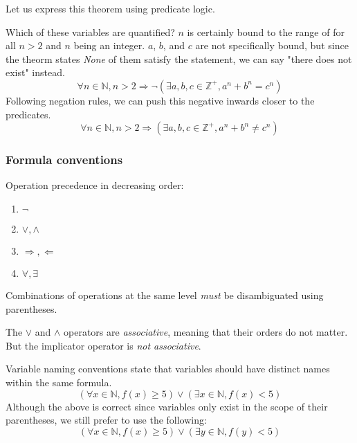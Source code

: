 \documentclass{article}
\begin{document}
Let us express this theorem using predicate logic. 

Which of these variables are quantified? $n$ is certainly bound to the range of 
for all $n > 2$ and $n$ being an integer. $a$, $b$, and $c$ are not specifically 
bound, but since the theorm states \textit{None} of them satisfy the statement, 
we can say "there does not exist" instead.
$$\forall n \in \mathbb{N}, n > 2 \Rightarrow \neg (\exists a, b, c \in 
\mathbb{Z}^+, a^n + b^n = c^n )$$
Following negation rules, we can push this negative inwards closer to the predicates.
$$\forall n \in \mathbb{N}, n > 2 \Rightarrow (\exists a, b, c \in 
\mathbb{Z}^+, a^n + b^n \ne c^n)$$

\subsubsection*{Formula conventions}
Operation precedence in decreasing order:
\begin{center}
\begin{enumerate}
    \item $\neg$
    \item $\lor, \land$
    \item $\Rightarrow, \Leftarrow$
    \item $\forall, \exists$
\end{enumerate}
\end{center}
Combinations of operations at the same level \textit{must} be disambiguated 
using parentheses. 

The $\lor$ and $\land$ operators are \textit{associative}, meaning that their 
orders do not matter. But the implicator operator is \textit{not associative}. 

Variable naming conventions state that variables should have distinct names 
within the same formula.
$$(\forall x \in \mathbb{N}, f(x) \geq 5) \lor (\exists x \in \mathbb{N}, f(x) < 5)$$
Although the above is correct since variables only exist in the scope of their 
parentheses, we still prefer to use the following:
$$(\forall x \in \mathbb{N}, f(x) \geq 5) \lor (\exists y \in \mathbb{N}, f(y) < 5)$$
\end{document}
